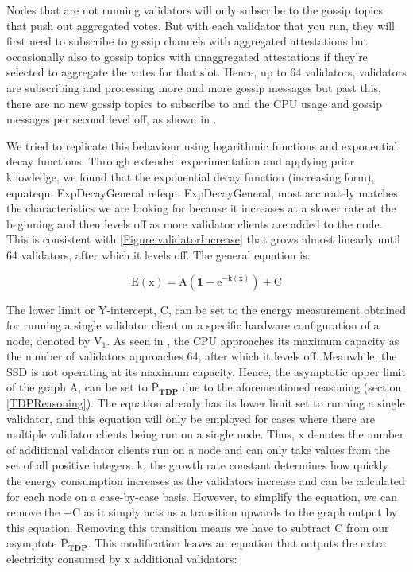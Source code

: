Nodes that are not running validators will only subscribe to the gossip topics that push out aggregated votes. But with each validator that you run, they will first need to subscribe to gossip channels with aggregated attestations but occasionally also to gossip topics with unaggregated attestations if they're selected to aggregate the votes for that slot. Hence, up to 64 validators, validators are subscribing and processing more and more gossip messages but past this, there are no new gossip topics to subscribe to and the CPU usage and gossip messages per second level off, as shown in .

We tried to replicate this behaviour using logarithmic functions and exponential decay functions. Through extended experimentation and applying prior knowledge, we found that the exponential decay function (increasing form), equat{eqn: ExpDecayGeneral} ref{eqn: ExpDecayGeneral}, most accurately matches the characteristics we are looking for because it increases at a slower rate at the beginning and then levels off as more validator clients are added to the node. This is consistent with \ref{Figure:validatorIncrease} that grows almost linearly until 64 validators, after which it levels off. The general equation is:

\begin{equation}
    \label{eqn: ExpDecayGeneral}
    \boldsymbol{\mathrm{E(\mathrm{x})} = \mathrm{A} (1-\mathrm{e}^{-\mathrm{k}(\mathrm{x})}) + \mathrm{C}}
\end{equation}

The lower limit or Y-intercept, $\boldsymbol{\mathrm{C}}$, can be set to the energy measurement obtained for running a single validator client on a specific hardware configuration of a node, denoted by $\boldsymbol{\mathrm{V_{1}}}$. As seen in , the CPU approaches its maximum capacity as the number of validators approaches 64, after which it levels off. Meanwhile, the SSD is not operating at its maximum capacity. Hence, the asymptotic upper limit of the graph $\boldsymbol{\mathrm{A}}$, can be set to $\boldsymbol{\mathrm{\overline{P}}_{TDP}}$ due to the aforementioned reasoning (section \ref{TDPReasoning}). The equation already has its lower limit set to running a single validator, and this equation will only be employed for cases where there are multiple validator clients being run on a single node. Thus, $\boldsymbol{\mathrm{x}}$ denotes the number of additional validator clients run on a node and can only take values from the set of all positive integers.  $\boldsymbol{\mathrm{k}}$, the growth rate constant determines how quickly the energy consumption increases as the validators increase and can be calculated for each node on a case-by-case basis. However, to simplify the equation, we can remove the $\boldsymbol{ + \mathrm{C}}$ as it simply acts as a transition upwards to the graph output by this equation. Removing this transition means we have to subtract $\boldsymbol{ \mathrm{C}}$ from our asymptote $\boldsymbol{\mathrm{\overline{P}}_{TDP}}$. This modification leaves an equation that outputs the extra electricity consumed by $\boldsymbol{\mathrm{x}}$ additional validators:

